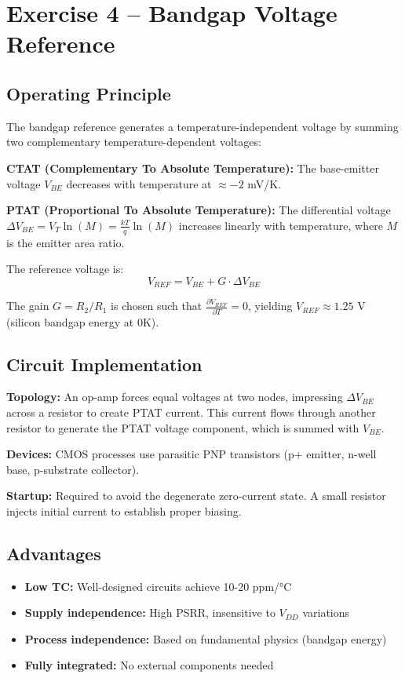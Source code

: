 \documentclass[main.tex]{subfiles}
\begin{document}
\section{Exercise 4 – Bandgap Voltage Reference}

\subsection*{Operating Principle}

The bandgap reference generates a temperature-independent voltage by summing two complementary temperature-dependent voltages:

\textbf{CTAT (Complementary To Absolute Temperature):} The base-emitter voltage $V_{BE}$ decreases with temperature at $\approx -2$ mV/K.

\textbf{PTAT (Proportional To Absolute Temperature):} The differential voltage $\Delta V_{BE} = V_T \ln(M) = \frac{kT}{q}\ln(M)$ increases linearly with temperature, where $M$ is the emitter area ratio.

The reference voltage is:
$$V_{REF} = V_{BE} + G \cdot \Delta V_{BE}$$

The gain $G = R_2/R_1$ is chosen such that $\frac{\partial V_{REF}}{\partial T} = 0$, yielding $V_{REF} \approx 1.25$ V (silicon bandgap energy at 0K).

\subsection*{Circuit Implementation}

\textbf{Topology:} An op-amp forces equal voltages at two nodes, impressing $\Delta V_{BE}$ across a resistor to create PTAT current. This current flows through another resistor to generate the PTAT voltage component, which is summed with $V_{BE}$.

\textbf{Devices:} CMOS processes use parasitic PNP transistors (p+ emitter, n-well base, p-substrate collector).

\textbf{Startup:} Required to avoid the degenerate zero-current state. A small resistor injects initial current to establish proper biasing.

\subsection*{Advantages}

\begin{itemize}
    \item \textbf{Low TC:} Well-designed circuits achieve 10-20 ppm/°C
    \item \textbf{Supply independence:} High PSRR, insensitive to $V_{DD}$ variations
    \item \textbf{Process independence:} Based on fundamental physics (bandgap energy)
    \item \textbf{Fully integrated:} No external components needed
\end{itemize}
\end{document}
